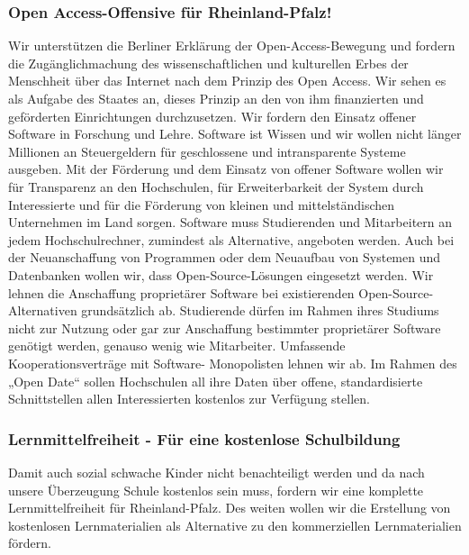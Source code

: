 \subsubsection{Open Access-Offensive für Rheinland-Pfalz!}
\abstimmung
Wir unterstützen die Berliner Erklärung der Open-Access-Bewegung und fordern die Zugänglichmachung des wissenschaftlichen und kulturellen Erbes der Menschheit über das Internet nach dem Prinzip des Open Access. Wir sehen es als Aufgabe des Staates an, dieses Prinzip an den von ihm finanzierten und geförderten Einrichtungen durchzusetzen. Wir fordern den Einsatz offener Software in Forschung und Lehre. Software ist Wissen und wir wollen nicht länger Millionen an Steuergeldern für geschlossene und intransparente Systeme ausgeben. Mit der Förderung und dem Einsatz von offener Software wollen wir für Transparenz an den Hochschulen, für Erweiterbarkeit der System durch Interessierte und für die Förderung von kleinen und mittelständischen Unternehmen im Land sorgen. Software muss Studierenden und Mitarbeitern an jedem Hochschulrechner, zumindest als Alternative, angeboten werden. Auch bei der Neuanschaffung von Programmen oder dem Neuaufbau von Systemen und Datenbanken wollen wir, dass Open-Source-Lösungen eingesetzt werden. Wir lehnen die Anschaffung proprietärer Software bei existierenden Open-Source- Alternativen grundsätzlich ab. Studierende dürfen im Rahmen ihres Studiums nicht zur Nutzung oder gar zur Anschaffung bestimmter proprietärer Software genötigt werden, genauso wenig wie Mitarbeiter. Umfassende Kooperationsverträge mit Software- Monopolisten lehnen wir ab. Im Rahmen des „Open Date“ sollen Hochschulen all ihre Daten über offene, standardisierte Schnittstellen allen Interessierten kostenlos zur Verfügung stellen.

\label{wp:bildung:freiheit2}

\subsubsection{Lernmittelfreiheit - Für eine kostenlose Schulbildung}
\abstimmung
Damit auch sozial schwache Kinder nicht benachteiligt werden und da nach unsere Überzeugung Schule kostenlos sein muss, fordern wir eine komplette Lernmittelfreiheit für Rheinland-Pfalz. Des weiten wollen wir die Erstellung von kostenlosen Lernmaterialien als Alternative zu den kommerziellen Lernmaterialien fördern.
 
